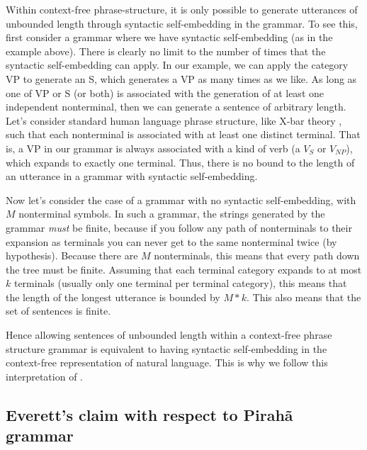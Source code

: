 \documentclass{article}
\begin{document}
Within context-free phrase-structure, it is only possible to generate utterances of unbounded length through syntactic self-embedding in the grammar.  To see this, first consider a grammar where we have syntactic self-embedding (as in the example above). There is clearly no limit to the number of times that the syntactic self-embedding can apply.  In our example, we can apply the category VP to generate an S, which generates a VP as many times as we like.  As long as one of VP or S (or both) is associated with the generation of at least one independent nonterminal, then we can generate a sentence of arbitrary length. Let's consider standard human language phrase structure, like X-bar theory \citep{jackendoff1977x}, such that each nonterminal is associated with at least one distinct terminal. That is, a VP in our grammar is always associated with a kind of verb (a $V_{S}$ or $V_{NP}$), which expands to exactly one terminal. Thus, there is no bound to the length of an utterance in a grammar with syntactic self-embedding.

Now let's consider the case of a grammar with no syntactic self-embedding, with $M$ nonterminal symbols. In such a grammar, the strings generated by the grammar \textit{must} be finite, because if you follow any path of nonterminals to their expansion as terminals you can never get to the same nonterminal twice (by hypothesis). Because there are $M$ nonterminals, this means that every path down the tree must be finite. Assuming that each terminal category expands to at most $k$ terminals (usually only one terminal per terminal category), this means that the length of the longest utterance is bounded by $M*k$. This also means that the set of sentences is finite.

Hence allowing sentences of unbounded length within a context-free phrase structure grammar is equivalent to having syntactic self-embedding in the context-free  representation of natural language.  This is why we follow this interpretation of \cite{hauser2002faculty}.


\subsection{Everett's claim with respect to Pirahã grammar}
\end{document}
